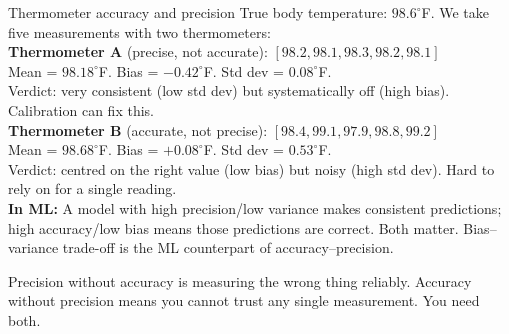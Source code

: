 \documentclass[a4paper,11pt]{article}
\begin{document}
\begin{worked}{Thermometer accuracy and precision}
True body temperature: $98.6^\circ$F. We take five measurements with two thermometers: \\[4pt]
\textbf{Thermometer A} (precise, not accurate): $[98.2, 98.1, 98.3, 98.2, 98.1]$ \\
Mean = $98.18^\circ$F. Bias = $-0.42^\circ$F. Std dev = $0.08^\circ$F. \\
Verdict: very consistent (low std dev) but systematically off (high bias). Calibration can fix this. \\[4pt]
\textbf{Thermometer B} (accurate, not precise): $[98.4, 99.1, 97.9, 98.8, 99.2]$ \\
Mean = $98.68^\circ$F. Bias = $+0.08^\circ$F. Std dev = $0.53^\circ$F. \\
Verdict: centred on the right value (low bias) but noisy (high std dev). Hard to rely on for a single reading. \\[4pt]
\textbf{In ML:} A model with high precision/low variance makes consistent predictions; high accuracy/low bias means those predictions are correct. Both matter. Bias--variance trade-off is the ML counterpart of accuracy--precision.
\end{worked}

\begin{keytake}
Precision without accuracy is measuring the wrong thing reliably. Accuracy without precision means you cannot trust any single measurement. You need both.
\end{keytake}
\end{document}
